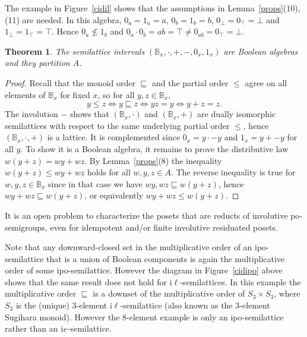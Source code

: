 \documentclass[12pt]{amsart}
\newtheorem{theorem}{Theorem}%
\begin{document}
The example in Figure~\ref{cidil} shows that the assumptions in Lemma~\ref{props}(10), (11) are needed. In this algebra, $0_a=1_a=a$, $0_b=1_b=b$, $0_\bot=0_\top=\bot$ and $1_\bot=1_\top=\top$. Hence $0_a\nleq 1_b$ and $0_a\cdot 0_b=ab=\top\ne0_{ab}=0_\top=\bot$.

\begin{theorem}
The semilattice intervals $(\mathbb B_x,\cdot,+,-,0_x,1_x)$ are
Boolean algebras and they partition $A$.
\end{theorem}
\begin{proof}
Recall that the monoid order $\sqsubseteq$ and the partial order $\le$ agree on all elements of $\mathbb B_x$ for fixed $x$, so for all $y,z\in\mathbb B_x$,
$$
y\le z\iff y\sqsubseteq z\iff yz=y\iff y+z=z.
$$
The involution $-$ shows that
$(\mathbb B_x,\cdot)$ and $(\mathbb B_x,+)$ are dually isomorphic semilattices with respect to the same underlying partial order $\le$, hence $(\mathbb B_x,\cdot,+)$ is a lattice. It is complemented since $0_x=y\cdot -y$ and $1_x=y+-y$ for all $y$. To show it is a Boolean algebra, it remains to prove the distributive law $w(y+z)=wy+wz$. By Lemma~\ref{props}(8) the inequality $w(y+z)\le wy+wz$ holds for all $w,y,z\in A$. The reverse inequality is true for $w,y,z\in\mathbb B_x$ since
in that case we have $wy,wz\sqsubseteq w(y+z)$, hence $wy+wz\sqsubseteq w(y+z)$, or equivalently $wy+wz\le w(y+z)$.
\end{proof}

It is an open problem to characterize the posets that are reducts of involutive po-semigroups, even for idempotent and/or finite involutive residuated posets.

Note that any downward-closed set in the multiplicative order of an ipo-semilattice that is a union of Boolean components is again the multiplicative order of some ipo-semilattice. However the diagram in Figure~\ref{cidipo} above shows that the same result does not hold for i$\ell$-semilattices. In this example the multiplicative order $\sqsubseteq$ is a downset of the multiplicative order of $S_3\times S_3$, where $S_3$ is the (unique) 3-element i$\ell$-semilattice (also known as the 3-element Sugihara monoid). However the 8-element example is only an ipo-semilattice rather than an i$e\\$-semilattice.
\end{document}
